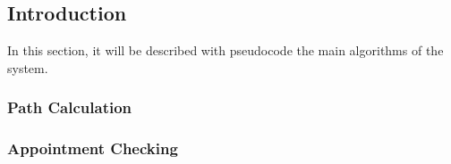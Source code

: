 \subsection{Introduction}
In this section, it will be described with pseudocode the main algorithms of the system.

\subsubsection{Path Calculation}


\subsubsection{Appointment Checking}
